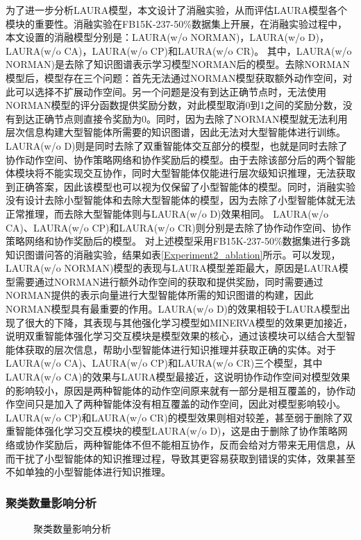 \documentclass[algorithmlist, AutoFakeBold, AutoFakeSlant, figurelist, tablelist, nomlist, engineering, openany]{seuthesix} %
\begin{document}
为了进一步分析LAURA模型，本文设计了消融实验，从而评估LAURA模型各个模块的重要性。消融实验在FB15K-237-50\%数据集上开展，在消融实验过程中，本文设置的消融模型分别是：LAURA(w/o NORMAN)，LAURA(w/o D)，LAURA(w/o CA)，LAURA(w/o CP)和LAURA(w/o CR)。
其中，LAURA(w/o NORMAN)是去除了知识图谱表示学习模型NORMAN后的模型。去除NORMAN模型后，模型存在三个问题：首先无法通过NORMAN模型获取额外动作空间，对此可以选择不扩展动作空间。另一个问题是没有到达正确节点时，无法使用NORMAN模型的评分函数提供奖励分数，对此模型取消0到1之间的奖励分数，没有到达正确节点则直接令奖励为0。同时，因为去除了NORMAN模型就无法利用层次信息构建大型智能体所需要的知识图谱，因此无法对大型智能体进行训练。
LAURA(w/o D)则是同时去除了双重智能体交互部分的模型，也就是同时去除了协作动作空间、协作策略网络和协作奖励后的模型。由于去除该部分后的两个智能体模块将不能实现交互协作，同时大型智能体仅能进行层次级知识推理，无法获取到正确答案，因此该模型也可以视为仅保留了小型智能体的模型。同时，消融实验没有设计去除小型智能体和去除大型智能体的模型，因为去除了小型智能体就无法正常推理，而去除大型智能体则与LAURA(w/o D)效果相同。
LAURA(w/o CA)、LAURA(w/o CP)和LAURA(w/o CR)则分别是去除了协作动作空间、协作策略网络和协作奖励后的模型。
对上述模型采用FB15K-237-50\%数据集进行多跳知识图谱问答的消融实验，结果如表\ref{Experiment2_ablation}所示。可以发现，LAURA(w/o NORMAN)模型的表现与LAURA模型差距最大，原因是LAURA模型需要通过NORMAN进行额外动作空间的获取和提供奖励，同时需要通过NORMAN提供的表示向量进行大型智能体所需的知识图谱的构建，因此NORMAN模型具有最重要的作用。LAURA(w/o D)的效果相较于LAURA模型出现了很大的下降，其表现与其他强化学习模型如MINERVA模型的效果更加接近，说明双重智能体强化学习交互模块是模型效果的核心，通过该模块可以结合大型智能体获取的层次信息，帮助小型智能体进行知识推理并获取正确的实体。对于LAURA(w/o CA)、LAURA(w/o CP)和LAURA(w/o CR)三个模型，其中LAURA(w/o CA)的效果与LAURA模型最接近，这说明协作动作空间对模型效果的影响较小，原因是两种智能体的动作空间原来就有一部分是相互覆盖的，协作动作空间只是加入了两种智能体没有相互覆盖的动作空间，因此对模型影响较小。LAURA(w/o CP)和LAURA(w/o CR)的模型效果则相对较差，甚至弱于删除了双重智能体强化学习交互模块的模型LAURA(w/o D)，这是由于删除了协作策略网络或协作奖励后，两种智能体不但不能相互协作，反而会给对方带来无用信息，从而干扰了小型智能体的知识推理过程，导致其更容易获取到错误的实体，效果甚至不如单独的小型智能体进行知识推理。

\subsubsection{聚类数量影响分析}
\begin{figure}[t]
  \centering
  \caption{聚类数量影响分析}
  \label{Experiment2_layer}
\end{figure}
\end{document}
